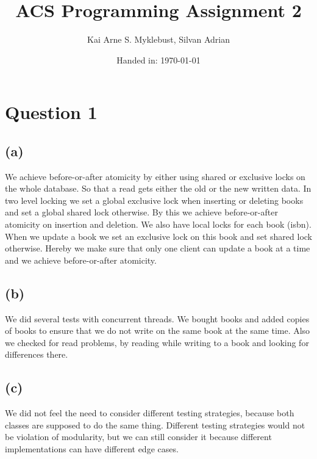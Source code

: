 \documentclass[12pt,a4paper]{article}
\begin{document}
\title{ACS Programming Assignment 2}
\subtitle{}

\author{Kai Arne S. Myklebust, Silvan Adrian}
\date{Handed in: \today}
	
\maketitle
\tableofcontents

\section{Question 1}
\subsection{(a)}
We achieve before-or-after atomicity by either using shared or exclusive locks on the whole database. So that a read gets either the old or the new written data.
In two level locking we set a global exclusive lock when inserting or deleting books and set a global shared lock otherwise. By this we achieve before-or-after atomicity on insertion and deletion. We also have local locks for each book (isbn). When we update a book we set an exclusive lock on this book and set shared lock otherwise. Hereby we make sure that only one client can update a book at a time and we achieve before-or-after atomicity.

\subsection{(b)}
We did several tests with concurrent threads. We bought books and added copies of books to ensure that we do not write on the same book at the same time. Also we checked for read problems, by reading while writing to a book and looking for differences there.

\subsection{(c)}
We did not feel the need to consider different testing strategies, because both classes are supposed to do the same thing. Different testing strategies would not be violation of modularity, but we can still consider it because different implementations can have different edge cases.
\end{document}
